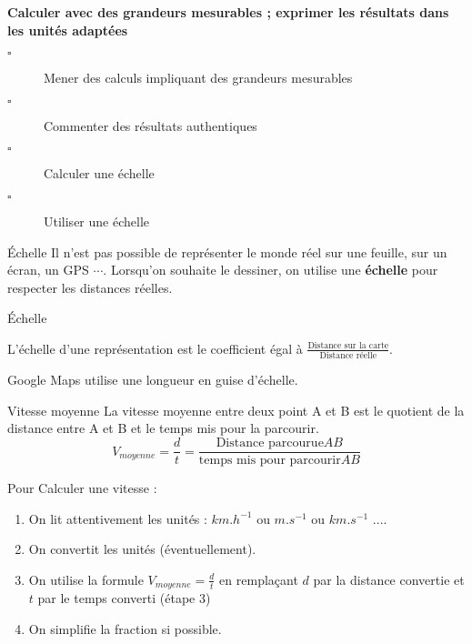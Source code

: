\begin{titre}[La proportionnalité]

\end{titre}

\begin{CpsCol}
\textbf{Calculer avec des grandeurs mesurables ; exprimer les résultats dans les unités adaptées}
\begin{description}
\item[$\square$] Mener des calculs impliquant des grandeurs mesurables
\item[$\square$] Commenter des résultats authentiques
\item[$\square$] Calculer une échelle
\item[$\square$] Utiliser une échelle
\end{description}
\end{CpsCol}




\begin{DefT}{Échelle}
Il n'est pas possible de représenter le monde réel sur une feuille, sur un écran, un GPS $\cdots$. Lorsqu'on souhaite le dessiner, on utilise une \textbf{échelle} pour respecter les distances réelles.
\end{DefT}

\begin{ThT}{Échelle}
\begin{description}
\item L'échelle d'une représentation est le coefficient égal à $\frac{\text{Distance sur la carte}}{\text{Distance réelle}}$. 
\item Google Maps utilise une longueur en guise d'échelle.
\end{description}
\end{ThT}



\begin{DefT}{Vitesse moyenne}
La vitesse moyenne  entre deux point A et B est le quotient de la distance entre A et B et le temps mis pour la parcourir. $$ V_{moyenne}= \frac{d}{t} = \frac{\text{Distance parcourue}AB}{\text{temps mis pour parcourir} AB} $$
\end{DefT}

\begin{Mt}
Pour Calculer une vitesse :
\begin{enumerate}
\item On lit attentivement les unités : $km.h^{-1}$ ou $m.s^{-1}$ ou $km.s^{-1}$ ....
\item On convertit les unités (éventuellement).
\item On utilise la formule $V_{moyenne}= \frac{d}{t}$ en remplaçant $d$ par la distance convertie et $t$ par le temps converti (étape 3)
\item On simplifie la fraction si possible.
\end{enumerate}
\end{Mt}



